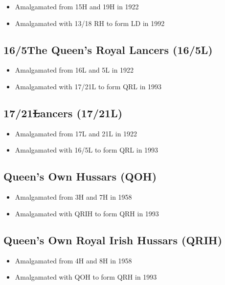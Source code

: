 \begin{itemize}
\item Amalgamated from 15H and 19H in 1922
\item Amalgamated with 13/18 RH to form LD in 1992
\end{itemize}

\subsection*{16\th/5\nth The Queen's Royal Lancers (16/5L)}

\begin{itemize}
\item Amalgamated from 16L and 5L in 1922
\item Amalgamated with 17/21L to form QRL in 1993
\end{itemize}

\subsection*{17\th/21\st Lancers (17/21L)}

\begin{itemize}
\item Amalgamated from 17L and 21L in 1922
\item Amalgamated with 16/5L to form QRL in 1993
\end{itemize}

\subsection*{Queen's Own Hussars (QOH)}

\begin{itemize}
\item Amalgamated from 3H and 7H in 1958
\item Amalgamated with QRIH to form QRH in 1993
\end{itemize}

\subsection*{Queen's Own Royal Irish Hussars (QRIH)}

\begin{itemize}
\item Amalgamated from 4H and 8H in 1958
\item Amalgamated with QOH to form QRH in 1993
\end{itemize}

